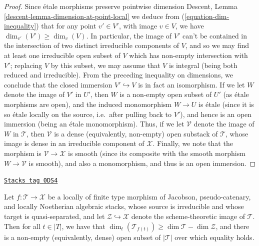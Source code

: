 \begin{proof}
\medskip\noindent
Since \'etale morphisms preserve pointwise dimension
Descent, Lemma \ref{descent-lemma-dimension-at-point-local}
we deduce from (\ref{equation-dim-inequality})
that for any point $v' \in V'$,
with image $v \in V$, we have
$\dim_{v'}( V') \geq \dim_v(V)$.
In particular, the image of $V'$ can't be contained in the intersection
of two distinct irreducible components of $V$, and so we may find
at least one irreducible open subset of $V$ which has non-empty intersection
with $V'$; replacing $V$ by this subset, we may assume that $V$ is integral
(being both reduced and irreducible).  From the preceding inequality
on dimensions, we conclude that the closed immersion $V' \hookrightarrow V$
is in fact an isomorphism.
If we let $W$ denote the image of $V'$
in $U'$, then $W$ is a non-empty
open subset of $U'$ (as \'etale morphisms are open),
and the induced monomorphism $W \to U$ is \'etale
(since it is so \'etale locally on the source, i.e.\ after pulling back
to $V'$), and hence is an open immersion (being an \'etale monomorphism).
Thus, if we let $\mathcal{V}$ denote the image of $W$ in $\mathcal{T}$,
then $\mathcal{V}$ is a dense (equivalently, non-empty) open substack of
$\mathcal{T}$,
whose image is dense in an irreducible component of $\mathcal{X}$.
Finally,
we note that the morphism is $\mathcal{V} \to \mathcal{X}$ is smooth
(since its composite
with the smooth morphism $W\to \mathcal{V}$ is smooth),
and also a monomorphism, and thus is an open immersion.
\end{proof}

\begin{lemma}
\label{stacks-geometry-lemma-dims-of-images}
\href{https://stacks.math.columbia.edu/tag/0DS4}{\texttt{Stacks tag 0DS4}}

Let $f: \mathcal{T} \to \mathcal{X}$ be a locally of finite type
morphism of Jacobson, pseudo-catenary, and locally Noetherian
algebraic stacks,
whose source is irreducible and whose target is quasi-separated,
and let $\mathcal{Z} \hookrightarrow \mathcal{X}$ denote the scheme-theoretic
image of $\mathcal{T}$.
Then for all $t \in |T|$,
we have that
$\dim_t( \mathcal{T}_{f(t)}) \geq \dim \mathcal{T}  - \dim \mathcal{Z}$,
and there is a non-empty (equivalently, dense)
open subset of $|\mathcal{T}|$ over which equality holds.
\end{lemma}

